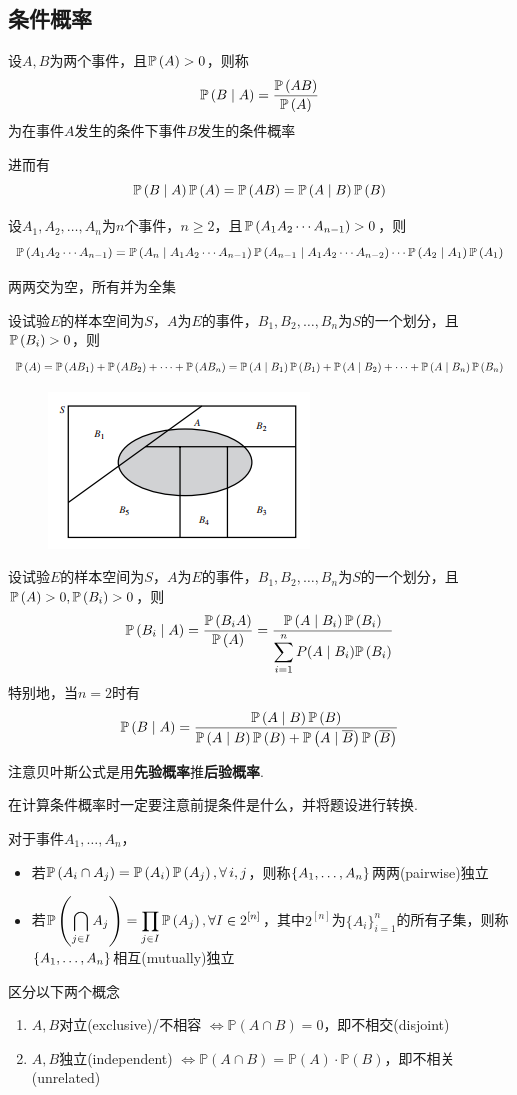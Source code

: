 \subsection{条件概率}
\begin{definition}[条件概率]
设$A,B$为两个事件，且$\mathbb{P}\left(A\right)>0$，则称
\[\mathbb{P}\left(B\mid A\right)=\dfrac{\mathbb{P}\left(AB\right)}{\mathbb{P}\left(A\right)}\]
为在事件$A$发生的条件下事件$B$发生的条件概率
\end{definition}
进而有
\[\mathbb{P}\left(B\mid A\right)\mathbb{P}\left(A\right)=\mathbb{P}\left(AB\right)=\mathbb{P}\left(A\mid B\right)\mathbb{P}\left(B\right)\]
\begin{theorem}[乘法公式]
设$A_1,A_2,\ldots,A_n$为$n$个事件，$n\geq 2$，且$\mathbb{P}\left(A_1A_2\cdots A_{n-1}\right)>0$，则
\[\mathbb{P}\left(A_1A_2\cdots A_{n-1}\right)=\mathbb{P}\left(A_n\mid A_1A_2\cdots A_{n-1}\right)\mathbb{P}\left(A_{n-1}\mid A_1A_2\cdots A_{n-2}\right)\cdots\mathbb{P}\left(A_2\mid A_1\right)\mathbb{P}\left(A_1\right)\]
\end{theorem}
\begin{definition}[划分]
两两交为空，所有并为全集
\end{definition}
\begin{theorem}[全概率公式]
设试验$E$的样本空间为$S$，$A$为$E$的事件，$B_1,B_2,\ldots,B_n$为$S$的一个划分，且$\mathbb{P}\left(B_i\right)>0$，则
\[\mathbb{P}\left(A\right)=\mathbb{P}\left(AB_1\right)+\mathbb{P}\left(AB_2\right)+\cdots+\mathbb{P}\left(AB_n\right)=\mathbb{P}\left(A\mid B_1\right)\mathbb{P}\left(B_1\right)+\mathbb{P}\left(A\mid B_2\right)+\cdots+\mathbb{P}\left(A\mid B_n\right)\mathbb{P}\left(B_n\right)\]
\end{theorem}
\begin{figure}[H]
\centering
\includegraphics[width=0.35\linewidth]{fig/total_probability.PNG}
\end{figure}
\begin{theorem}
设试验$E$的样本空间为$S$，$A$为$E$的事件，$B_1,B_2,\ldots,B_n$为$S$的一个划分，且$\mathbb{P}\left(A\right)>0,\mathbb{P}\left(B_i\right)>0$，则
\[\mathbb{P}\left(B_i\mid A\right)=\frac{\mathbb{P}\left(B_iA\right)}{\mathbb{P}\left(A\right)}=\frac{\mathbb{P}\left(A\mid B_i\right)\mathbb{P}\left(B_i\right)}{\displaystyle\sum_{i=1}^nP(A\mid B_i)\mathbb{P}\left(B_i\right)}\]
特别地，当$n=2$时有
\[\mathbb{P}\left(B\mid A\right)=\dfrac{\mathbb{P}\left(A\mid B\right)\mathbb{P}\left(B\right)}{\mathbb{P}\left(A\mid B\right)\mathbb{P}\left(B\right)+\mathbb{P}\left(A\mid \mathop{\overline{B}}\right)\mathbb{P}\left(\mathop{\overline{B}}\right)}\]
\end{theorem}
\par 注意贝叶斯公式是用\textbf{先验概率}推\textbf{后验概率}.
\par 在计算条件概率时一定要注意前提条件是什么，并将题设进行转换.
\begin{definition}[独立性]
\rm 对于事件$A_1,\ldots,A_n$，
\begin{itemize}
	\item 若$\mathbb{P}\left(A_i\cap A_j\right)=\mathbb{P}\left(A_i\right)\mathbb{P}\left(A_j\right),\forall\,i,j$，则称$\{A_1,\dots,A_n\}$两两(pairwise)独立
	\item 若$\displaystyle\mathbb{P}\left(\bigcap_{j\in I}A_j\right)=\prod_{j\in I}\mathbb{P}\left(A_j\right),\forall I\in 2^{[n]}$，其中$2^{[n]}$为$\{A_i\}_{i=1}^n$的所有子集，则称$\{A_1,\dots,A_n\}$相互(mutually)独立
\end{itemize}
\end{definition}
\par 区分以下两个概念
\begin{enumerate}
	\item $A,B$对立(exclusive)/不相容 $\Leftrightarrow \mathbb{P}(A\cap B)=0$，即不相交(disjoint)
	\item $A,B$独立(independent) $\Leftrightarrow \mathbb{P}(A\cap B)=\mathbb{P}(A)\cdot\mathbb{P}(B)$，即不相关(unrelated)
\end{enumerate}